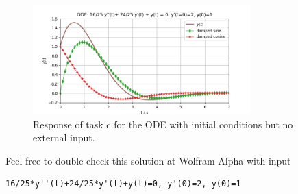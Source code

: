 \begin{figure}[h!]
\centering
\includegraphics[width=0.75\textwidth]{../laplace_transform/initial_conditions_response_parts}
\caption{Response of task c for the ODE with initial conditions but no external input.}
\label{fig:initial_conditions_response_parts}
\end{figure}

Feel free to double check this solution at Wolfram Alpha with input
\begin{verbatim}
16/25*y''(t)+24/25*y'(t)+y(t)=0, y'(0)=2, y(0)=1
\end{verbatim}



